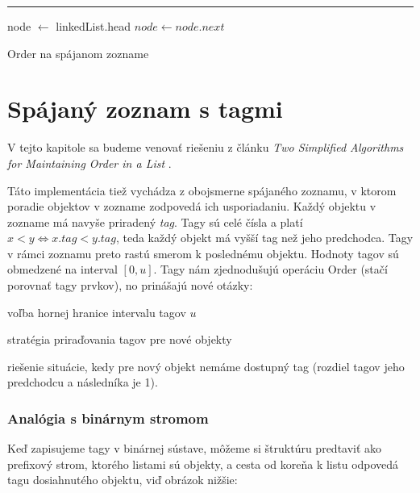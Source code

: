 \documentclass[
  digital,     %
  oneside,     %
  nosansbold,  %
  nocolorbold, %
  lof,         %
  lot,         %
]{fithesis4}
\begin{document}
\begin{algorithm}
\hrule\vspace{0.2em}
node $\leftarrow$ linkedList.head\;
{
    {
        \;
    }
    {
        \;
    }
    $node \leftarrow node.next$\;
}
\caption{Order na spájanom zozname}
\end{algorithm}


\chapter{Spájaný zoznam s tagmi}

V tejto kapitole sa budeme venovať riešeniu z článku \textit{Two Simplified Algorithms for Maintaining Order in a List} \cite{paper1_ordered_list}.

Táto implementácia tiež vychádza z obojsmerne spájaného zoznamu, v ktorom poradie objektov v zozname zodpovedá ich usporiadaniu. Každý objektu v zozname má navyše priradený \textit{tag}. Tagy sú celé čísla a platí $x < y \iff x.tag < y.tag$, teda každý objekt má vyšší tag než jeho predchodca. Tagy v rámci zoznamu preto rastú smerom k poslednému objektu. Hodnoty tagov sú obmedzené na interval $[0, u]$. Tagy nám zjednodušujú operáciu Order (stačí porovnať tagy prvkov), no prinášajú nové otázky:
\begin{compactenum}
  \item voľba hornej hranice intervalu tagov $u$
  \item stratégia priraďovania tagov pre nové objekty
  \item riešenie situácie, kedy pre nový objekt nemáme dostupný tag (rozdiel tagov jeho predchodcu a následníka je 1).
\end{compactenum}

\subsection{Analógia s binárnym stromom}
Keď zapisujeme tagy v binárnej sústave, môžeme si štruktúru predtaviť ako prefixový strom, ktorého listami sú objekty, a cesta od koreňa k listu odpovedá tagu dosiahnutého objektu, viď obrázok nižšie:
\end{document}
